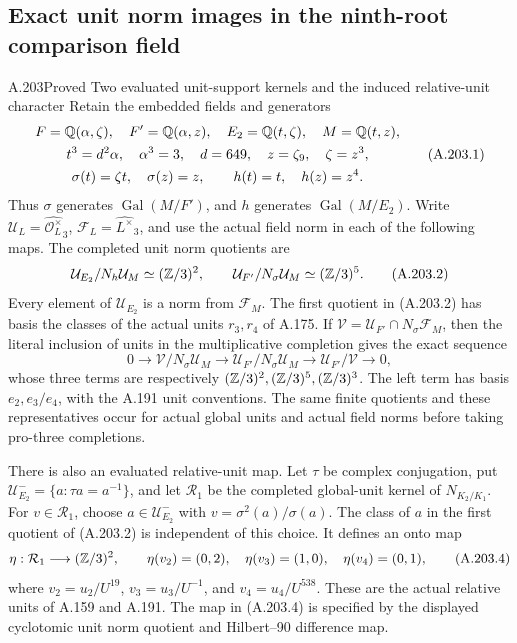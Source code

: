 \subsection{Exact unit norm images in the ninth-root comparison field}

\begin{statement}{A.203}{Proved}
{Two evaluated unit-support kernels and the induced relative-unit character}
Retain the embedded fields and generators
\[
\begin{gathered}
 F=\mathbb Q(\alpha,\zeta),\quad F'=\mathbb Q(\alpha,z),\quad
 E_2=\mathbb Q(t,\zeta),\quad M=\mathbb Q(t,z),\\
 t^3=d^2\alpha,\quad \alpha^3=3,\quad d=649,
 \quad z=\zeta_9,\quad\zeta=z^3,\\
 \sigma(t)=\zeta t,\quad\sigma(z)=z,
 \qquad h(t)=t,\quad h(z)=z^4.
\end{gathered}
\tag{A.203.1}
\]
Thus \(\sigma\) generates \(\operatorname{Gal}(M/F')\),
and \(h\) generates \(\operatorname{Gal}(M/E_2)\).
Write
\(\mathcal U_L=\widehat{\mathcal O_L^\times}_3\),
\(\mathcal F_L=\widehat{L^\times}_3\), and use the actual
field norm in each of the following maps.
The completed unit norm quotients are
\[
 \mathcal U_{E_2}/N_h\mathcal U_M\simeq(\mathbb Z/3)^2,
 \qquad
 \mathcal U_{F'}/N_\sigma\mathcal U_M\simeq(\mathbb Z/3)^5.
\tag{A.203.2}
\]
Every element of \(\mathcal U_{E_2}\) is a norm from
\(\mathcal F_M\).  The first quotient in (A.203.2) has
basis the classes of the actual units \(r_3,r_4\) of
A.175.  If
\(\mathcal V=\mathcal U_{F'}\cap N_\sigma\mathcal F_M\),
then the literal inclusion of units in the multiplicative
completion gives the exact sequence
\[
 0\longrightarrow\mathcal V/N_\sigma\mathcal U_M
 \longrightarrow\mathcal U_{F'}/N_\sigma\mathcal U_M
 \longrightarrow\mathcal U_{F'}/\mathcal V
 \longrightarrow0,
\tag{A.203.3}
\]
whose three terms are respectively
\((\mathbb Z/3)^2,(\mathbb Z/3)^5,(\mathbb Z/3)^3\).
The left term has basis \(e_2,e_3/e_4\), with the A.191
unit conventions.  The same finite quotients and these
representatives occur for actual global units and actual
field norms before taking pro-three completions.

There is also an evaluated relative-unit map.  Let
\(\tau\) be complex conjugation, put
\(\mathcal U_{E_2}^-=\{a:\tau a=a^{-1}\}\), and let
\(\mathcal R_1\) be the completed global-unit kernel of
\(N_{K_2/K_1}\).  For \(v\in\mathcal R_1\), choose
\(a\in\mathcal U_{E_2}^-\) with
\(v=\sigma^2(a)/\sigma(a)\).
The class of \(a\) in the first quotient of (A.203.2)
is independent of this choice.  It defines an onto map
\[
 \eta:\mathcal R_1\longrightarrow(\mathbb Z/3)^2,
 \qquad
 \eta(v_2)=(0,2),\quad
 \eta(v_3)=(1,0),\quad
 \eta(v_4)=(0,1),
\tag{A.203.4}
\]
where
\(v_2=u_2/U^{19}\), \(v_3=u_3/U^{-1}\), and
\(v_4=u_4/U^{538}\).
These are the actual relative units of A.159 and A.191.
The map in (A.203.4) is specified by the displayed
cyclotomic unit norm quotient and Hilbert--90 difference
map.
\end{statement}

